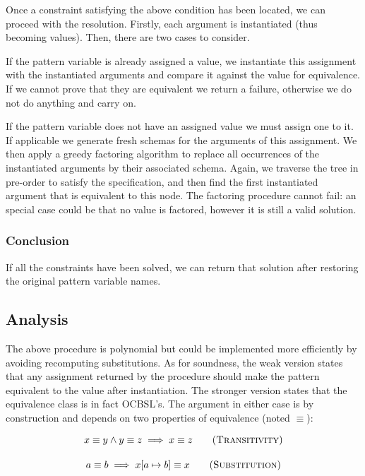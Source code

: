 Once a constraint satisfying the above condition has been located, we can proceed with the resolution. Firstly, each argument is instantiated (thus becoming values). Then, there are two cases to consider.

If the pattern variable is already assigned a value, we instantiate this assignment with the instantiated arguments and compare it against the value for equivalence. If we cannot prove that they are equivalent we return a failure, otherwise we do not do anything and carry on.

If the pattern variable does not have an assigned value we must assign one to it. If applicable we generate fresh schemas for the arguments of this assignment. We then apply a greedy factoring algorithm to replace all occurrences of the instantiated arguments by their associated schema. Again, we traverse the tree in pre-order to satisfy the specification, and then find the first instantiated argument that is equivalent to this node. The factoring procedure cannot fail: an special case could be that no value is factored, however it is still a valid solution.

\subsubsection{Conclusion}

If all the constraints have been solved, we can return that solution after restoring the original pattern variable names.

\subsection{Analysis}

The above procedure is polynomial but could be implemented more efficiently by avoiding recomputing substitutions. As for soundness, the weak version states that any assignment returned by the procedure should make the pattern equivalent to the value after instantiation. The stronger version states that the equivalence class is in fact OCBSL's. The argument in either case is by construction and depends on two properties of equivalence (noted $\equiv$):

\begin{gather}
  {x \equiv y \land y \equiv z} \implies {x \equiv z} \tag{\textsc{Transitivity}} \\[1em]
  {a \equiv b} \implies {x[a \mapsto b] \equiv x} \tag{\textsc{Substitution}}
\end{gather}

